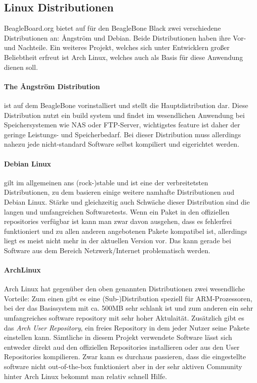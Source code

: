 \documentclass[12pt, twoside, a4paper]{scrbook}
\begin{document}
\subsection{Linux Distributionen}
BeagleBoard.org bietet auf für den BeagleBone Black zwei verschiedene Distributionen an: {\AA}ngström und Debian. Beide Distributionen haben ihre Vor- und Nachteile. Ein weiteres Projekt, welches sich unter Entwicklern großer Beliebtheit erfreut ist Arch Linux, welches auch als Basis für diese Anwendung dienen soll.

\paragraph{The {\AA}ngström Distribution} ist auf dem BeagleBone vorinstalliert und stellt die Hauptdistribution dar. Diese Distribution nutzt ein build system und findet im wesendlichen Anwendung bei Speichersystemen wie NAS oder FTP-Server, wichtigstes feature ist daher der geringe Leistungs- und Speicherbedarf. Bei dieser Distribution muss allerdings nahezu jede nicht-standard Software selbst kompiliert und eigerichtet werden.

\paragraph{Debian Linux} gilt im allgemeinen ans (rock-)stable und ist eine der verbreitetsten Distributionen, zu dem basieren einige weitere namhafte Distributionen aud Debian Linux. Stärke und gleichzeitig auch Schwäche dieser Distribution sind die langen und umfangreichen Softwaretests. Wenn ein Paket in den offiziellen repositories verfügbar ist kann man zwar davon ausgehen, dass es fehlerfrei funktioniert und zu allen anderen angebotenen Pakete kompatibel ist, allerdings liegt es meist nicht mehr in der aktuellen Version vor. Das kann gerade bei Software aus dem Bereich Netzwerk/Internet problematisch werden.

\paragraph{ArchLinux} Arch Linux hat gegenüber den oben genannten Distributionen zwei wesendliche Vorteile: Zum einen gibt es eine (Sub-)Distribution speziell für ARM-Prozessoren, bei der das Basissystem mit ca. 500MB sehr schlank ist und zum anderen ein sehr umfangreiches software repository mit sehr hoher Aktulaität. Zusätzlich gibt es das \textit{Arch User Repository}, ein freies Repository in dem jeder Nutzer seine Pakete einstellen kann. Sämtliche in diesem Projekt verwendete Software lässt sich entweder direkt aud den offiziellen Repositories installieren oder aus den User Repositories kompilieren. Zwar kann es durchaus passieren, dass die eingestellte software nicht out-of-the-box funktioniert aber in der sehr aktiven Community hinter Arch Linux bekommt man relativ schnell Hilfe.
\end{document}

